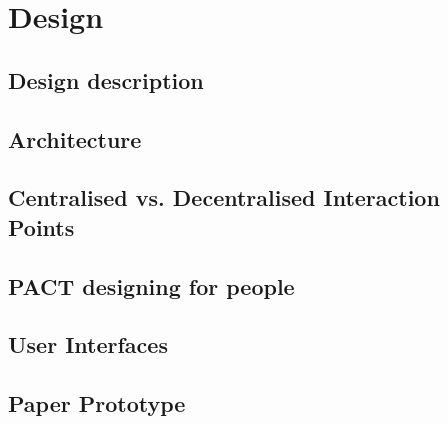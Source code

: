 \chapter{Design}


\section{Design description}


\section{Architecture}


\section{Centralised vs. Decentralised Interaction Points}


\section{PACT designing for people}


\section{User Interfaces}


\section{Paper Prototype}

